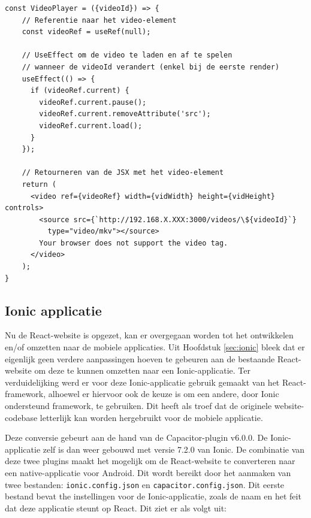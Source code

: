 \begin{mdframed}[backgroundcolor=bg]
  \begin{verbatim}
const VideoPlayer = ({videoId}) => {
    // Referentie naar het video-element
    const videoRef = useRef(null);

    // UseEffect om de video te laden en af te spelen
    // wanneer de videoId verandert (enkel bij de eerste render)
    useEffect(() => {
      if (videoRef.current) {
        videoRef.current.pause();
        videoRef.current.removeAttribute('src');
        videoRef.current.load();
      }
    });

    // Retourneren van de JSX met het video-element
    return (
      <video ref={videoRef} width={vidWidth} height={vidHeight} controls>
        <source src={`http://192.168.X.XXX:3000/videos/\${videoId}`}
          type="video/mkv"></source>
        Your browser does not support the video tag.
      </video>
    );
}
  \end{verbatim}
\end{mdframed}


\subsection{Ionic applicatie}
\label{sec:ionic-applicatie}

Nu de React-website is opgezet, kan er overgegaan worden tot het ontwikkelen en/of omzetten naar de mobiele applicaties. Uit Hoofdstuk \ref{sec:ionic} bleek dat er eigenlijk geen verdere aanpassingen hoeven te gebeuren aan de bestaande React-website om deze te kunnen omzetten naar een Ionic-applicatie. Ter verduidelijking werd er voor deze Ionic-applicatie gebruik gemaakt van het React-framework, alhoewel er hiervoor ook de keuze is om een andere, door Ionic ondersteund framework, te gebruiken. Dit heeft als troef dat de originele website-codebase letterlijk kan worden hergebruikt voor de mobiele applicatie.

Deze conversie gebeurt aan de hand van de Capacitor-plugin v6.0.0. De Ionic-applicatie zelf is dan weer gebouwd met versie 7.2.0 van Ionic. De combinatie van deze twee plugins maakt het mogelijk om de React-website te converteren naar een native-applicatie voor Android. Dit wordt bereikt door het aanmaken van twee bestanden: \verb|ionic.config.json| en \verb|capacitor.config.json|. Dit eerste bestand bevat the instellingen voor de Ionic-applicatie, zoals de naam en het feit dat deze applicatie steunt op React. Dit ziet er als volgt uit:

